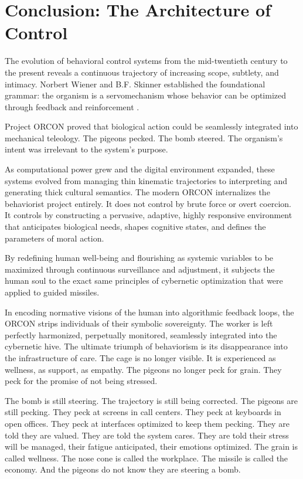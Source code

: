 \documentclass[runningheads]{llncs}
\begin{document}
\section{Conclusion: The Architecture of Control}

The evolution of behavioral control systems from the mid-twentieth century to the present reveals a continuous trajectory of increasing scope, subtlety, and intimacy. Norbert Wiener and B.F. Skinner established the foundational grammar: the organism is a servomechanism whose behavior can be optimized through feedback and reinforcement \cite{wiener1948cybernetics,skinner1953science}.

Project ORCON proved that biological action could be seamlessly integrated into mechanical teleology. The pigeons pecked. The bomb steered. The organism's intent was irrelevant to the system's purpose.

As computational power grew and the digital environment expanded, these systems evolved from managing thin kinematic trajectories to interpreting and generating thick cultural semantics. The modern ORCON internalizes the behaviorist project entirely. It does not control by brute force or overt coercion. It controls by constructing a pervasive, adaptive, highly responsive environment that anticipates biological needs, shapes cognitive states, and defines the parameters of moral action.

By redefining human well-being and flourishing as systemic variables to be maximized through continuous surveillance and adjustment, it subjects the human soul to the exact same principles of cybernetic optimization that were applied to guided missiles.

In encoding normative visions of the human into algorithmic feedback loops, the ORCON strips individuals of their symbolic sovereignty. The worker is left perfectly harmonized, perpetually monitored, seamlessly integrated into the cybernetic hive. The ultimate triumph of behaviorism is its disappearance into the infrastructure of care. The cage is no longer visible. It is experienced as wellness, as support, as empathy. The pigeons no longer peck for grain. They peck for the promise of not being stressed.

The bomb is still steering. The trajectory is still being corrected. The pigeons are still pecking. They peck at screens in call centers. They peck at keyboards in open offices. They peck at interfaces optimized to keep them pecking. They are told they are valued. They are told the system cares. They are told their stress will be managed, their fatigue anticipated, their emotions optimized. The grain is called wellness. The nose cone is called the workplace. The missile is called the economy. And the pigeons do not know they are steering a bomb.
\end{document}
